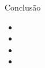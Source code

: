 \begin{frame}{Conclusão}
\begin{itemize}
\item 
\item 
\item 
\item 
\end{itemize}
    
\end{frame}
